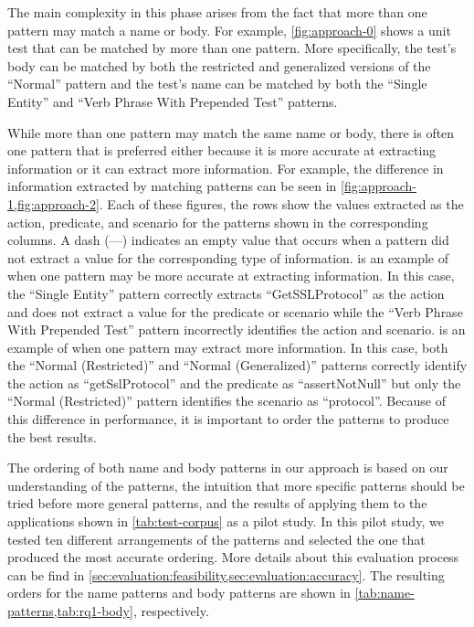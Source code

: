 \documentclass[proposal.tex]{subfiles}
\begin{document}
The main complexity in this phase arises from the fact that more than one pattern may match a name or body.
% 
For example, \cref{fig:approach-0} shows a unit test that can be matched by more than one pattern.
%
More specifically, the test's body can be matched by both the restricted and generalized versions of the \enquote{Normal} pattern and the test's name can be matched by both the \enquote{Single Entity} and \enquote{Verb Phrase With Prepended Test} patterns.


While more than one pattern may match the same name or body, there is often one pattern that is preferred either because it is more accurate at extracting information or it can extract more information.
%
For example, the difference in information extracted by matching patterns can be seen in \cref{fig:approach-1,fig:approach-2}.
%
Each of these figures, the rows show the values extracted as the action, predicate, and scenario for the patterns shown in the corresponding columns.
%
A dash (---) indicates an empty value that occurs when a pattern did not extract a value for the corresponding type of information.
%
 is an example of when one pattern may be more accurate at extracting information.
%
In this case, the \enquote{Single Entity} pattern correctly extracts \enquote{GetSSLProtocol} as the action and does not extract a value for the predicate or scenario while the \enquote{Verb Phrase With Prepended Test} pattern incorrectly identifies the action and scenario.
%
 is an example of when one pattern may extract more information.
%
In this case, both the \enquote{Normal (Restricted)} and \enquote{Normal (Generalized)} patterns correctly identify the action as \enquote{getSslProtocol} and the predicate as \enquote{assertNotNull} but only the \enquote{Normal (Restricted)} pattern identifies the scenario as \enquote{protocol}.
%
Because of this difference in performance, it is important to order the patterns to produce the best results.


The ordering of both name and body patterns in our approach is based on our understanding of the patterns, the intuition that more specific patterns should be tried before more general patterns, and the results of applying them to the applications shown in \cref{tab:test-corpus} as a pilot study.
%
In this pilot study, we tested ten different arrangements of the patterns and selected the one that produced the most accurate ordering.
%
More details about this evaluation process can be find in \cref{sec:evaluation:feasibility,sec:evaluation:accuracy}.
%
The resulting orders for the name patterns and body patterns are shown in \cref{tab:name-patterns,tab:rq1-body}, respectively.
\end{document}
